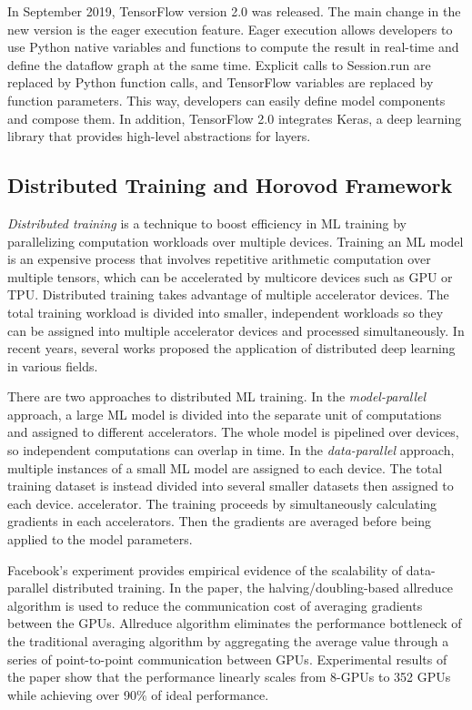 In September 2019, TensorFlow version 2.0 was released\cite{tf2announce}.
The main change in the new version is the eager execution feature.
Eager execution allows developers to use Python native variables
and functions to compute the result in real-time and define the
dataflow graph at the same time.
Explicit calls to Session.run are replaced by Python function calls,
and TensorFlow variables are replaced by function parameters.
This way, developers can easily define model components and compose them. 
In addition, TensorFlow 2.0 integrates Keras\cite{keras},
a deep learning library that provides high-level abstractions for layers.


\subsection{Distributed Training and Horovod Framework}

\textit{Distributed training} is a technique to boost efficiency in ML training
by parallelizing computation workloads over multiple devices.
Training an ML model is an expensive process that involves repetitive
arithmetic computation over multiple tensors,
which can be accelerated by multicore devices such as GPU or TPU. 
Distributed training takes advantage of multiple accelerator devices.
The total training workload is divided into smaller, independent workloads
so they can be assigned into multiple accelerator devices and
processed simultaneously. 
In recent years, several works proposed the application of distributed
deep learning in various fields.

There are two approaches to distributed ML training.
In the \textit{model-parallel} approach, a large ML model is divided into 
the separate unit of computations and assigned to different accelerators. 
The whole model is pipelined over devices, so independent computations
can overlap in time.
In the \textit{data-parallel} approach, multiple instances of a small ML model
are assigned to each device. The total training dataset is instead
divided into several smaller datasets then assigned to each device.
accelerator. The training proceeds by simultaneously calculating gradients
in each accelerators. Then the gradients are averaged before being 
applied to the model parameters.

Facebook's experiment \cite{facebook2018} provides empirical evidence of
the scalability of data-parallel distributed training. In the paper, 
the halving/doubling-based allreduce algorithm is used to reduce the communication 
cost of averaging gradients between the GPUs. 
Allreduce algorithm eliminates the performance bottleneck of the traditional
averaging algorithm by aggregating the average value through a series of
point-to-point communication between GPUs. 
Experimental results of the paper show that the performance linearly
scales from 8-GPUs to 352 GPUs while achieving over 90\% of ideal performance.

